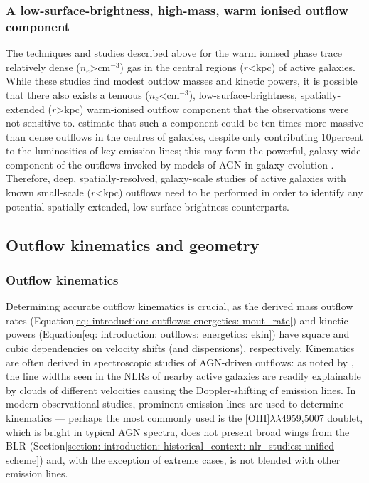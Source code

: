 \subsubsection{A low-surface-brightness, high-mass, warm ionised outflow component}

The techniques and studies described above for the warm ionised phase trace relatively dense ($n_e$\;\textgreater{}\;cm$^{-3}$) gas in the central regions ($r$\;\textless{}\;kpc) of active galaxies. While these studies find modest outflow masses and kinetic powers, it is possible that there also exists a tenuous ($n_e$\;\textless{}\;cm$^{-3}$), low-surface-brightness, spatially-extended ($r$\;\textgreater{}\;kpc) warm-ionised outflow component that the observations were not sensitive to. \citet{Spence2018} estimate that such a component could be ten times more massive than dense outflows in the centres of galaxies, despite only contributing 10\;per\;cent to the luminosities of key emission lines; this may form the powerful, galaxy-wide component of the outflows invoked by models of AGN in galaxy evolution \citep{DiMatteo2005,Springel2005,Schaye2015}. Therefore, deep, spatially-resolved, galaxy-scale studies of active galaxies with known small-scale ($r$\;\textless{}\;kpc) outflows need to be performed in order to identify any potential spatially-extended, low-surface brightness counterparts.

\subsection{Outflow kinematics and geometry}
\label{section: introduction: outflows: kinematics_and_geometry}

\subsubsection{Outflow kinematics}
\label{section: introduction: outflows: kinematics_and_geometry: kinematics}

Determining accurate outflow kinematics is crucial, as the derived mass outflow rates (Equation\;\ref{eq: introduction: outflows: energetics: mout_rate}) and kinetic powers (Equation\;\ref{eq: introduction: outflows: energetics: ekin}) have square and cubic dependencies on velocity shifts (and dispersions), respectively. Kinematics are often derived in spectroscopic studies of AGN-driven outflows: as noted by \citet{Seyfert1943}, the line widths seen in the NLRs of nearby active galaxies are readily explainable by clouds of different velocities causing the Doppler-shifting of emission lines. In modern observational studies, prominent emission lines are used to determine kinematics --- perhaps the most commonly used is the [OIII]$\lambda\lambda$4959,5007 doublet, which is bright in typical AGN spectra, does not present broad wings from the BLR (Section\;\ref{section: introduction: historical_context: nlr_studies: unified scheme}) and, with the exception of extreme cases, is not blended with other emission lines. 

